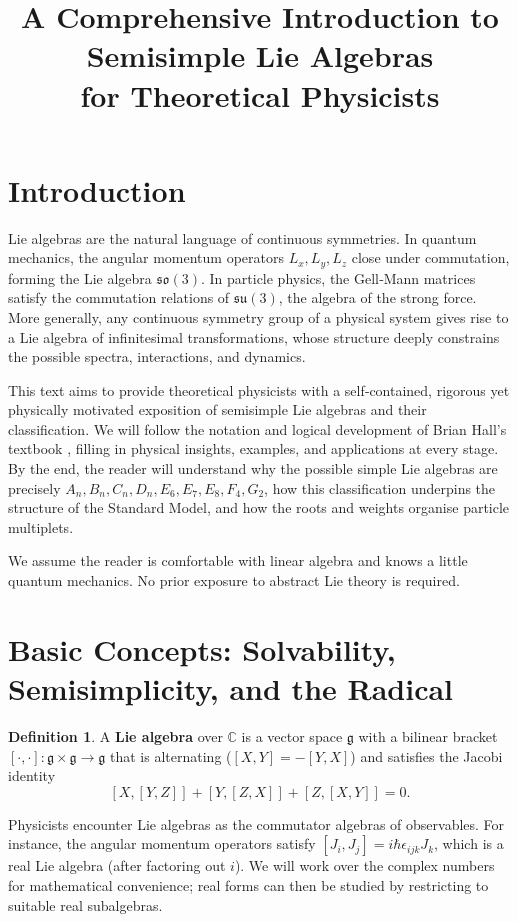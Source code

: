 \documentclass{article}
\title{A Comprehensive Introduction to Semisimple Lie Algebras\\
for Theoretical Physicists}
\author{}
\date{}
\theoremstyle{definition}
\newtheorem{definition}[theorem]{Definition}
\theoremstyle{remark}
\newcommand{\g}{\mathfrak{g}}
\newcommand{\C}{\mathbb{C}}
\begin{document}
\maketitle
\tableofcontents

\section*{Introduction}
Lie algebras are the natural language of continuous symmetries. In quantum mechanics,
the angular momentum operators $L_x, L_y, L_z$ close under commutation, forming the
Lie algebra $\mathfrak{so}(3)$. In particle physics, the Gell‑Mann matrices satisfy
the commutation relations of $\mathfrak{su}(3)$, the algebra of the strong force.
More generally, any continuous symmetry group of a physical system gives rise to a
Lie algebra of infinitesimal transformations, whose structure deeply constrains the
possible spectra, interactions, and dynamics.

This text aims to provide theoretical physicists with a self‑contained, rigorous
yet physically motivated exposition of semisimple Lie algebras and their
classification. We will follow the notation and logical development of Brian Hall’s
textbook \cite{Hall}, filling in physical insights, examples, and applications at
every stage. By the end, the reader will understand why the possible simple Lie
algebras are precisely $A_n, B_n, C_n, D_n, E_6, E_7, E_8, F_4, G_2$, how this
classification underpins the structure of the Standard Model, and how the roots
and weights organise particle multiplets.

We assume the reader is comfortable with linear algebra and knows a little quantum
mechanics. No prior exposure to abstract Lie theory is required.

\section{Basic Concepts: Solvability, Semisimplicity, and the Radical}

\begin{definition}
A \textbf{Lie algebra} over $\C$ is a vector space $\g$ with a bilinear bracket
$[\cdot,\cdot]:\g\times\g\to\g$ that is alternating ($[X,Y]=-[Y,X]$) and satisfies
the Jacobi identity
\[
[X,[Y,Z]] + [Y,[Z,X]] + [Z,[X,Y]] = 0.
\]
\end{definition}
Physicists encounter Lie algebras as the commutator algebras of observables. For
instance, the angular momentum operators satisfy $[J_i,J_j] = i\hbar \epsilon_{ijk} J_k$,
which is a real Lie algebra (after factoring out $i$). We will work over the
complex numbers for mathematical convenience; real forms can then be studied by
restricting to suitable real subalgebras.
\end{document}
